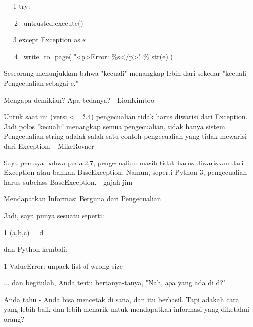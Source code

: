 \vspace{12pt}
~~ 1 try: \par
\vspace{12pt}
~~~2~  untrusted.execute() \par
\vspace{12pt}
~~ 3 except Exception as e: \par
\vspace{12pt}
~~~4~  write $  \_  $to $  \_  $page( "<p>Error:  $  \%  $s</p>"  $  \%  $ str(e) ) \par
\vspace{12pt}
Seseorang menunjukkan bahwa "kecuali" menangkap lebih dari sekedar "kecuali Pengecualian sebagai e." \par
\vspace{12pt}
Mengapa demikian? Apa bedanya? - LionKimbro \par
\vspace{12pt}
Untuk saat ini (versi <= 2.4) pengecualian tidak harus diwarisi dari Exception. Jadi polos 'kecuali:' menangkap semua pengecualian, tidak hanya sistem. Pengecualian string adalah salah satu contoh pengecualian yang tidak mewarisi dari Exception. - MikeRovner \par
\vspace{12pt}
Saya percaya bahwa pada 2,7, pengecualian masih tidak harus diwariskan dari Exception atau bahkan BaseException. Namun, seperti Python 3, pengecualian harus subclass BaseException. - gajah jim \par
\vspace{12pt}
Mendapatkan Informasi Berguna dari Pengecualian \par
\vspace{12pt}
Jadi, saya punya sesuatu seperti: \par
\vspace{12pt}
1 (a,b,c) = d \par
\vspace{12pt}
dan Python kembali: \par
\vspace{12pt}
1 ValueError: unpack list of wrong size \par
\vspace{12pt}
... dan begitulah, Anda tentu bertanya-tanya, "Nah, apa yang ada di d?" \par
\vspace{12pt}
Anda tahu - Anda bisa mencetak di sana, dan itu berhasil. Tapi adakah cara yang lebih baik dan lebih menarik untuk mendapatkan informasi yang diketahui orang? \par
